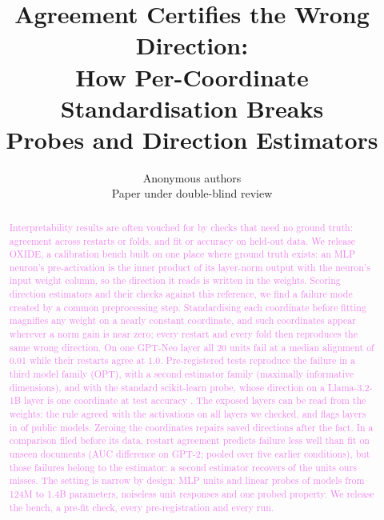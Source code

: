 \documentclass[10pt]{article}
\title{Agreement Certifies the Wrong Direction:\\How Per-Coordinate Standardisation Breaks\\Probes and Direction Estimators}
\author{\name Anonymous authors\\ \addr Paper under double-blind review}
\newcommand{\benchname}{OXIDE}
\newcommand{\draft}[1]{\textcolor{violet}{#1}}
\begin{document}
\maketitle

\begin{abstract}
\draft{Interpretability results are often vouched for by checks that need no ground truth: agreement
across restarts or folds, and fit or accuracy on held-out data. We release \benchname{}, a calibration
bench built on one place where ground truth exists: an MLP neuron's pre-activation is the inner
product of its layer-norm output with the neuron's input weight column, so the direction it reads is
written in the weights. Scoring direction estimators and their checks against this reference, we find
a failure mode created by a common preprocessing step. Standardising each coordinate before fitting
magnifies any weight on a nearly constant coordinate, and such coordinates appear wherever a norm gain
is near zero; every restart and every fold then reproduces the same wrong direction. On one GPT-Neo
layer all 20 units fail at a median alignment of 0.01 while their restarts agree at 1.0. Pre-registered
tests reproduce the failure in a third model family (OPT), with a second estimator family (maximally
informative dimensions), and with the standard scikit-learn probe, whose direction on a Llama-3.2-1B
layer is \eThreeBLlamaShare{} one coordinate at test accuracy \eThreeBLlamaAcc. The exposed layers can
be read from the weights: the rule agreed with the activations on all \mapLayers{} layers we checked,
and flags layers in \mapExposed{} of \mapModels{} public models. Zeroing the coordinates repairs
saved directions after the fact. In a comparison filed before its data, restart agreement predicts
failure less well than fit on unseen documents (AUC difference \eOneDelta{} \eOneCI{} on GPT-2;
\poolTest{} \poolTestCI{} pooled over five earlier conditions), but those failures belong to the
estimator: a second estimator recovers \eTwoMidOnly{} of the \eTwoLsFail{} units ours misses. The
setting is narrow by design: MLP units and linear probes of models from 124M to 1.4B parameters, noiseless
unit responses and one probed property. We release the bench, a pre-fit check, every
pre-registration and every run.}
%

\end{abstract}
\end{document}
